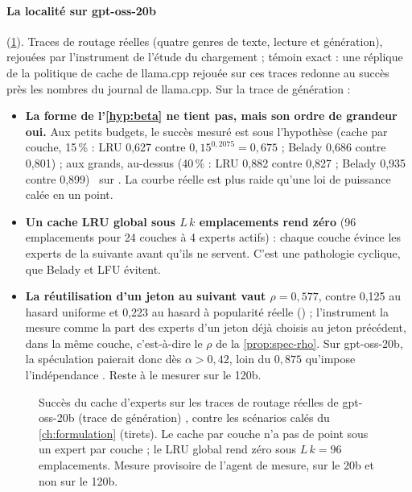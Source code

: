 \paragraph{La localité sur gpt-oss-20b} (\cref{fig:localite-mesuree}). Traces de routage réelles (quatre genres de texte, lecture et génération), rejouées par l'instrument de l'étude du chargement ; témoin exact : une réplique de la politique de cache de llama.cpp rejouée sur ces traces redonne au succès près les nombres du journal de llama.cpp. Sur la trace de génération :
\begin{itemize}
\item \textbf{La forme de l'\cref{hyp:beta} ne tient pas, mais son ordre de grandeur oui.} Aux petits budgets, le succès mesuré est sous l'hypothèse (cache par couche, 15\,\% : LRU 0,627 contre $0{,}15^{0{,}2075} = 0{,}675$ ; Belady 0,686 contre 0,801) ; aux grands, au-dessus (40\,\% : LRU 0,882 contre 0,827 ; Belady 0,935 contre 0,899) \calc~sur \mes. La courbe réelle est plus raide qu'une loi de puissance calée en un point.
\item \textbf{Un cache LRU global sous $L\,k$ emplacements rend zéro} (96 emplacements pour 24 couches à 4 experts actifs) : chaque couche évince les experts de la suivante avant qu'ils ne servent. C'est une pathologie cyclique, que Belady et LFU évitent.
\item \textbf{La réutilisation d'un jeton au suivant vaut $\rho = 0{,}577$}, contre 0,125 au hasard uniforme et 0,223 au hasard à popularité réelle () ; l'instrument la mesure comme la part des experts d'un jeton déjà choisis au jeton précédent, dans la même couche, c'est-à-dire le $\rho$ de la \cref{prop:spec-rho}. Sur gpt-oss-20b, la spéculation paierait donc dès $\alpha > 0{,}42$, loin du $0{,}875$ qu'impose l'indépendance \calc. Reste à le mesurer sur le 120b.
\end{itemize}

\begin{figure}[ht]
\centering
\GrapheLocaliteMesuree
\caption[Localité mesurée sur gpt-oss-20b contre les hypothèses]{Succès du cache d'experts sur les traces de routage réelles de gpt-oss-20b (trace de génération) \mes, contre les scénarios calés du \cref{ch:formulation} (tirets). Le cache par couche n'a pas de point sous un expert par couche ; le LRU global rend zéro sous $L\,k = 96$ emplacements. Mesure provisoire de l'agent de mesure, sur le 20b et non sur le 120b.}
\label{fig:localite-mesuree}
\end{figure}

